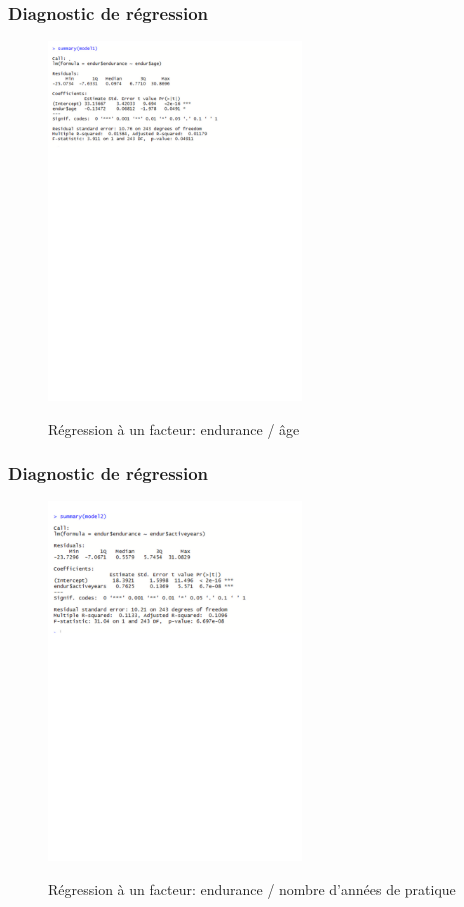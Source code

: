 \begin{frame}
\frametitle{Diagnostic de régression}
\begin{figure}
  \centering
  \includegraphics[width=0.6\textwidth]{summarymodel1}\\
  \caption{Régression à un facteur: endurance / âge}
\end{figure}
\end{frame}


\begin{frame}
\frametitle{Diagnostic de régression}
\begin{figure}
  \centering
  \includegraphics[width=0.6\textwidth]{summarymodel2}\\
  \caption{Régression à un facteur: endurance / nombre d'années de pratique}
\end{figure}
\end{frame}

